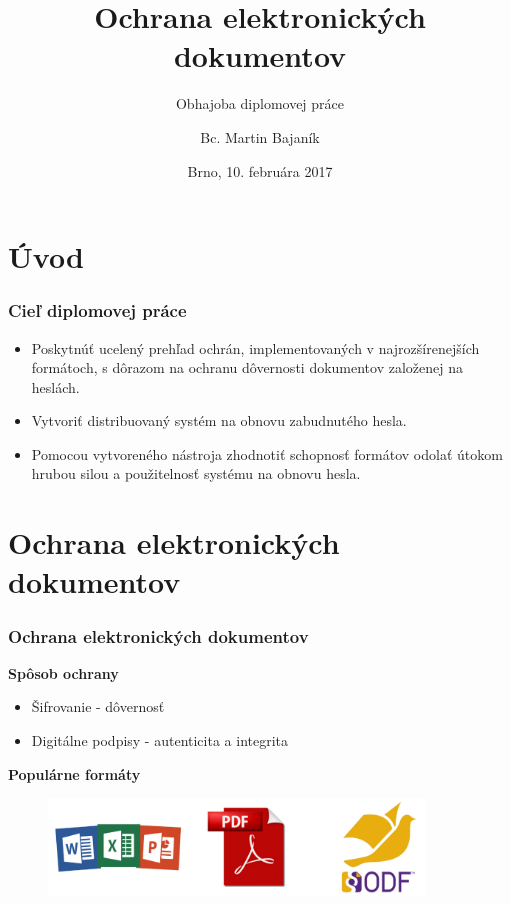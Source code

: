 \documentclass[xcolor=dvipsnames]{beamer}
\subtitle{Obhajoba diplomovej práce}
\title[Ochrana elektronických dokumentov]{Ochrana elektronických dokumentov}
\author[Bc. Martin Bajaník]{Bc. Martin Bajaník}
\institute[FI MU]{Fakulta informatiky\\Masarykova univerzita\\\texttt{396204@mail.muni.cz}}
\date[10. 2. 2017]{Brno, 10. februára 2017}
\def\itemtitle#1{{\bfseries#1\smallskip}}
\begin{document}

\section{Úvod}
\begin{frame}
  \titlepage
\end{frame}



\begin{frame}
	\frametitle{Cieľ diplomovej práce}	
	\begin{itemize}
		\item Poskytnúť ucelený prehľad ochrán, implementovaných v najrozšírenejších formátoch, s dôrazom na ochranu dôvernosti dokumentov založenej na heslách. 
		\item Vytvoriť distribuovaný systém na obnovu zabudnutého hesla.
		\item Pomocou vytvoreného nástroja zhodnotiť schopnosť formátov odolať útokom hrubou silou a použitelnosť systému na obnovu hesla.  
	\end{itemize}
	
\end{frame}


\section{Ochrana elektronických dokumentov}
\begin{frame}\frametitle{Ochrana elektronických dokumentov}
	\itemtitle{Spôsob ochrany}
	\begin{itemize}
		\item Šifrovanie - dôvernosť
		\item Digitálne podpisy - autenticita a integrita
	\end{itemize}
	\bigskip
	\itemtitle{Populárne formáty}
	\begin{figure}[h]
		\centering
		\includegraphics[width=100mm]{images/docs_logos.pdf} \\
		\vspace{-1mm}		
	\end{figure}
\end{frame}
\end{document}
